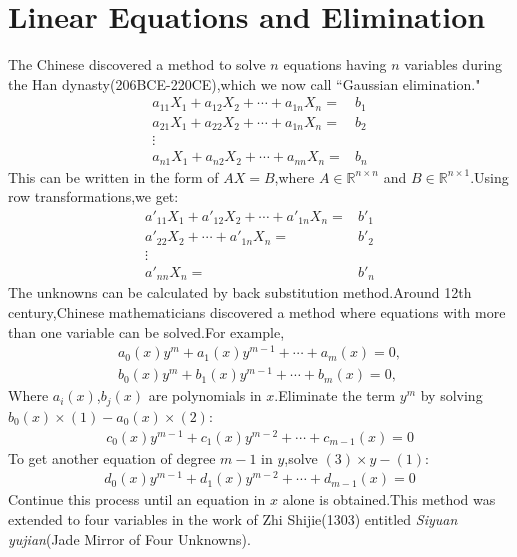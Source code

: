 \documentclass[a4paper,reqno,11pt]{book}
\theoremstyle{plain}%
\theoremstyle{definition}
\newcommand{\RR}{{\mathbb R}}
\begin{document}
\section{Linear Equations and Elimination}
The Chinese discovered a method to solve $n$ equations having $n$ variables during the Han dynasty(206BCE-220CE),which we now call ``Gaussian elimination."
\begin{align*}
    a_{11}X_{1}+a_{12}X_{2}+\cdots+a_{1n}X_{n}=&b_{1}\\
    a_{21}X_{1}+a_{22}X_{2}+\cdots+a_{1n}X_{n}=&b_{2}\\
    \vdots\\
    a_{n1}X_{1}+a_{n2}X_{2}+\cdots+a_{nn}X_{n}=&b_{n}
\end{align*}
This can be written in the form of $AX=B$,where $A\in\RR^{n\times n}$ and $B\in\RR^{n\times1}$.Using row transformations,we get:
\begin{align*}
    a'_{11}X_{1}+a'_{12}X_{2}+\cdots+a'_{1n}X_{n}=&b'_{1}\\
                 a'_{22}X_{2}+\cdots+a'_{1n}X_{n}=&b'_{2}\\
                                            \vdots\\
                                      a'_{nn}X_{n}=&b'_{n}
\end{align*}
The unknowns can be calculated by back substitution method.Around 12th century,Chinese mathematicians discovered a method where equations with more than one variable can be solved.For example,
\begin{align}
    a_{0}(x)y^m+a_{1}(x)y^{m-1}+\cdots+a_{m}(x)=0,\\
    b_{0}(x)y^m+b_{1}(x)y^{m-1}+\cdots+b_{m}(x)=0,
\end{align}
Where $a_{i}(x)$,$b_{j}(x)$ are polynomials in $x$.Eliminate the term $y^m$ by solving $b_{0}(x)\times(1)-a_{0}(x)\times(2)$:
\begin{align}
    c_{0}(x)y^{m-1}+c_{1}(x)y^{m-2}+\cdots+c_{m-1}(x)=0
\end{align}
To get another equation of degree $m-1$ in $y$,solve $(3)\times y-(1)$:
\begin{align}
    d_{0}(x)y^{m-1}+d_{1}(x)y^{m-2}+\cdots+d_{m-1}(x)=0
\end{align}
Continue this process until an equation in $x$ alone is obtained.This method was extended to four variables in the work of Zhi Shijie(1303) entitled \textit{Siyuan yujian}(Jade Mirror of Four Unknowns).
\end{document}
